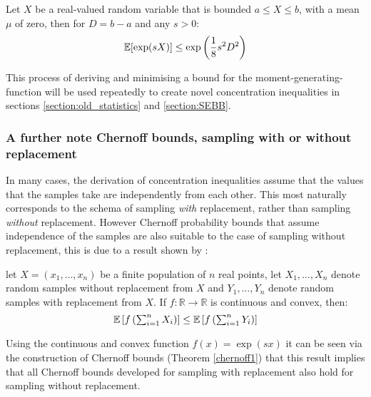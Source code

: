 \begin{lemma}\label{Hoeffdings_lemma_lemma}
Let $X$ be a real-valued random variable that is bounded $a\le X\le b$, with a mean $\mu$ of zero, then for $D=b-a$ and any $s>0$:
$$\operatorname{\mathbb{E}}[\exp(sX)] \le \exp\left(\frac{1}{8}s^2D^2 \right)$$
\end{lemma}

This process of deriving and minimising a bound for the moment-generating-function will be used repeatedly to create novel concentration inequalities in sections \ref{section:old_statistics} and \ref{section:SEBB}.



\subsubsection{A further note Chernoff bounds, sampling with or without replacement}

In many cases, the derivation of concentration inequalities assume that the values that the samples take are independently from each other. 
This most naturally corresponds to the schema of sampling \textit{with} replacement, rather than sampling \textit{without} replacement.
However Chernoff probability bounds that assume independence of the samples are also suitable to the case of sampling without replacement, this is due to a result shown by \cite{hoeffding1}:

\begin{lemma}\label{hoeffdings_reduction}
let $X=(x_1,\dots,x_n)$ be a finite population of $n$ real points, let $X_1,\dots,X_n$ denote random samples without replacement from $X$ and $Y_1,\dots,Y_n$ denote random samples with replacement from $X$. 
If $f:\mathbb{R}\rightarrow\mathbb{R}$ is continuous and convex, then:
$$\textstyle \operatorname{\mathbb{E}}\left[f\left(\sum_{i=1}^nX_i\right)\right]\le\operatorname{\mathbb{E}}\left[f\left(\sum_{i=1}^nY_i\right)\right] $$
\end{lemma}

Using the continuous and convex function $f(x)=\exp(sx)$ it can be seen via the construction of Chernoff bounds (Theorem \ref{chernoff1}) that this result implies that all Chernoff bounds developed for sampling with replacement also hold for sampling without replacement.



